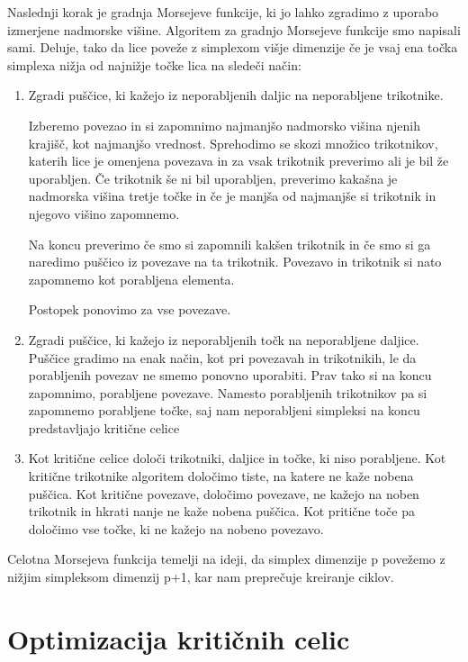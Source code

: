 \documentclass{article}
\begin{document}
Naslednji korak je gradnja Morsejeve funkcije, ki jo lahko zgradimo z uporabo izmerjene nadmorske višine. Algoritem za gradnjo Morsejeve funkcije smo napisali sami. Deluje, tako da lice poveže z simplexom višje dimenzije če je vsaj ena točka simplexa nižja od najnižje točke lica na sledeči način:
\begin{enumerate}
    \item Zgradi puščice, ki kažejo iz neporabljenih daljic na neporabljene trikotnike.
    
    Izberemo povezao in si zapomnimo najmanjšo nadmorsko višina njenih krajišč, kot najmanjšo vrednost. Sprehodimo se skozi množico trikotnikov, katerih lice je omenjena povezava in za vsak trikotnik preverimo ali je bil že uporabljen. Če trikotnik še ni bil uporabljen, preverimo kakašna je nadmorska višina tretje točke in če je manjša od najmanjše si trikotnik in njegovo višino zapomnemo.
    
    Na koncu preverimo če smo si zapomnili kakšen trikotnik in če smo si ga naredimo puščico iz povezave na ta trikotnik. Povezavo in trikotnik si nato zapomnemo kot porabljena elementa.
    
    Postopek ponovimo za vse povezave.
    
    
    \item Zgradi puščice, ki kažejo iz neporabljenih točk na neporabljene daljice.
    Puščice gradimo na enak način, kot pri povezavah in trikotnikih, le da porabljenih povezav ne smemo ponovno uporabiti. Prav tako si na koncu zapomnimo, porabljene povezave. Namesto porabljenih trikotnikov pa si zapomnemo porabljene točke, saj nam neporabljeni simpleksi na koncu predstavljajo kritične celice
    
    \item Kot kritične celice določi trikotniki, daljice in točke, ki niso porabljene. Kot kritične trikotnike algoritem določimo tiste, na katere ne kaže nobena puščica. Kot kritične povezave, določimo povezave, ne kažejo na noben trikotnik in hkrati nanje ne kaže nobena puščica. Kot pritične toče pa določimo vse točke, ki ne kažejo na nobeno povezavo. 
\end{enumerate}
Celotna Morsejeva funkcija temelji na ideji, da simplex dimenzije p povežemo z nižjim simpleksom dimenzij p+1, kar nam preprečuje kreiranje ciklov.

\section{Optimizacija kritičnih celic}
\end{document}
